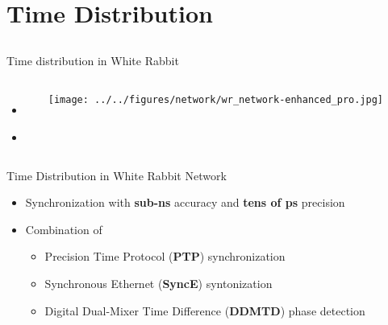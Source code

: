 \documentclass[compress,red]{beamer}
\begin{document}
\section{Time Distribution}
\subsection{}
\begin{frame}{Time distribution in White Rabbit}


\begin{columns}[c]
 
  \begin{itemize}
    \item \textbf{\color{blue!90}{High accuracy/precision synchronization}}
    \item \color{gray}{Deterministic, reliable and low-latency Control Data delivery}
  \end{itemize}

    \begin{center}
   \texttt{[image: ../../figures/network/wr\_network-enhanced\_pro.jpg]}
    \end{center}
\end{columns}

\end{frame}
\begin{frame}{Time Distribution in White Rabbit Network}

  \begin{itemize}
    \item Synchronization with {\bf sub-ns} accuracy and {\bf tens of  ps} precision
    \item Combination of
	\begin{itemize}
	  \item Precision Time Protocol ({\bf PTP}) synchronization
	  \item Synchronous Ethernet ({\bf SyncE}) syntonization
	  \item Digital Dual-Mixer Time Difference ({\bf DDMTD}) phase detection
	\end{itemize}
  \end{itemize}
\end{frame}
\end{document}
